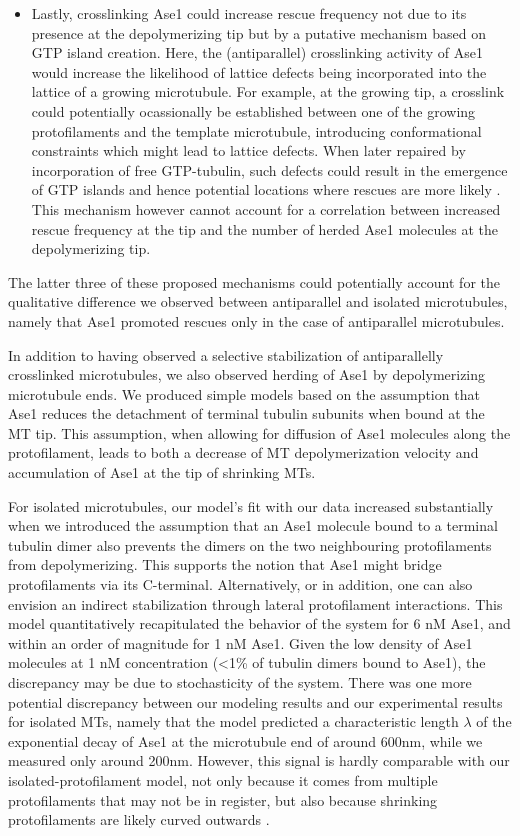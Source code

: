 \begin{itemize}
    \item Lastly, crosslinking Ase1 could increase rescue frequency not due to its presence at the depolymerizing tip but by a putative mechanism based on GTP island creation. Here, the (antiparallel) crosslinking activity of Ase1 would increase the likelihood of lattice defects being incorporated into the lattice of a growing microtubule. For example, at the growing tip, a crosslink could potentially ocassionally be established between one of the growing protofilaments and the template microtubule, introducing conformational constraints which might lead to lattice defects. When later repaired by incorporation of free GTP-tubulin, such defects could result in the emergence of GTP islands and hence potential locations where rescues are more likely . This mechanism however cannot account for a correlation between increased rescue frequency at the tip and the number of herded Ase1 molecules at the depolymerizing tip.
\end{itemize}
The latter three of these proposed mechanisms could potentially account for the qualitative difference we observed between antiparallel and isolated microtubules, namely that Ase1 promoted rescues only in the case of antiparallel microtubules.\par

In addition to having observed a selective stabilization of antiparallelly crosslinked microtubules, we also observed herding of Ase1 by depolymerizing microtubule ends. We produced simple models based on the assumption that Ase1 reduces the detachment of terminal tubulin subunits when bound at the MT tip. This assumption, when allowing for diffusion of Ase1 molecules along the protofilament, leads to both a decrease of MT depolymerization velocity and accumulation of Ase1 at the tip of shrinking MTs. \par

For isolated microtubules, our model's fit with our data increased substantially when we introduced the assumption that an Ase1 molecule bound to a terminal tubulin dimer also prevents the dimers on the two neighbouring protofilaments from depolymerizing. This supports the notion that Ase1 might bridge protofilaments via its C-terminal. Alternatively, or in addition, one can also envision an indirect stabilization through lateral protofilament interactions. This model quantitatively recapitulated the behavior of the system for 6 nM Ase1, and within an order of magnitude for 1 nM Ase1. Given the low density of Ase1 molecules at 1 nM concentration (<1\% of tubulin dimers bound to Ase1), the discrepancy may be due to stochasticity of the system. There was one more potential discrepancy between our modeling results and our experimental results for isolated MTs, namely that the model predicted a characteristic length $\lambda$ of the exponential decay of Ase1 at the microtubule end of around 600nm, while we measured only around 200nm. However, this signal is hardly comparable with our isolated-protofilament model, not only because it comes from multiple protofilaments that may not be in register, but also because shrinking protofilaments are likely curved outwards \parencite{McIntosh2008}. \par

